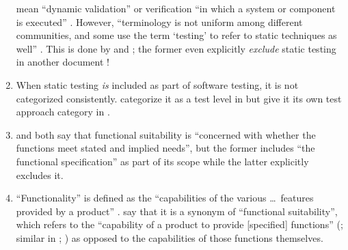 \begin{enumerate}
          mean ``dynamic validation'' \citep[p.~5\=/1]{SWEBOK2025} or verification
          ``in which a system or component is executed'' \citep[p.~427]{IEEE2017}.
          However, ``terminology is not uniform among different communities, and
          some use the term `testing' to refer to static techniques%
           as well'' \citep[p.~5\=/2]{SWEBOK2025}.
          This is done by \citet[pp.~16\==17]{IEEE2022} and
          \citet[pp.~8\==9]{Gerrard2000a}; the former even explicitly
          \emph{exclude} static testing in another
          document \citeyearpar[p.~440]{IEEE2017}!
    \item %
          When static testing \emph{is} included as part of software testing,
          it is not categorized consistently. \citeauthor{IEEE2021b} categorize
          it as a test level in \citeyearpar[p.~43]{IEEE2021b} but give it its
          own test approach category in \citeyearpar[p.~10, 23, Fig.~2]{IEEE2022}.
    \item %
          \citet{ISO_IEC2023a} and \citet[p.~196]{IEEE2017} both say that
          functional suitability is ``concerned with whether the functions meet
          stated and implied needs'', but the former includes ``the functional
          specification'' as part of its scope while the latter explicitly
          excludes it.
    \item %
          ``Functionality'' is defined as the ``capabilities of the various
          \dots\ features provided by a product'' \citep[p.~196]{IEEE2017}.
          \citetISTQB{} say that it is a synonym of ``functional suitability'',
          which refers to the ``capability of a product to provide [specified]
          functions'' (\citealp{ISO_IEC2023a}; similar in
          \citealp[p.~196]{IEEE2017}; \citealpISTQB{}) as opposed to the
          capabilities of those functions themselves.

\end{enumerate}
